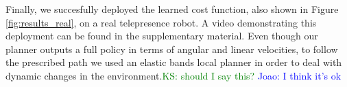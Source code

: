 \documentclass[letterpaper, 10 pt, conference]{ieeeconf}
\newcommand{\jm}[1]{\textcolor{blue}{Joao: #1}}
\newcommand{\ks}[1]{\textcolor{green}{KS: #1}}
\begin{document}
	Finally, we succesfully deployed the learned cost function, also shown in Figure \ref{fig:results_real}, on a real telepresence robot. A video demonstrating this deployment can be found in the supplementary material. Even though our planner outputs a full policy in terms of angular and linear velocities, to follow the prescribed path we used an elastic bands local planner in order to deal with dynamic changes in the environment.\ks{should I say this?} \jm{I think it's ok} 






\end{document}
